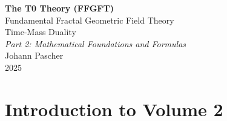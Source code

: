 
	
	\setcounter{section}{0}
	\setcounter{subsection}{0}
	\setcounter{subsubsection}{0}
	\setcounter{paragraph}{0}
	
	\setcounter{secnumdepth}{1}  %
	\makeatletter
	\renewcommand*\l@part[2]{%
		\ifnum \c@tocdepth >-2\relax
		\addpenalty{-\@highpenalty}%
		\addvspace{0.8em \@plus\p@}%
		{\leftskip 0em \relax
			\rightskip \@tocrmarg
			\parfillskip -\rightskip
			\parindent 0em \relax\@afterindenttrue
			\interlinepenalty\@M
			\leavevmode
			{\footnotesize\bfseries #1}\nobreak
			\leaders\hbox{$\m@th\mkern \@dotsep mu\hbox{}\mkern \@dotsep mu$}\hfill
			\nobreak\hb@xt@\@pnumwidth{\hss #2}\par}%
		\addvspace{0.2em \@plus\p@}%
		\nobreak
		\fi}
	\makeatother
	
	\renewcommand{\cftchapfont}{\footnotesize\bfseries}
	\renewcommand{\cftchappagefont}{\footnotesize\bfseries}
	\setlength{\cftbeforechapskip}{0.3em}
	
	\setcounter{tocdepth}{0}
	\begin{titlepage}
		\centering
		\vspace*{2cm}
		
		{\Huge\bfseries The T0 Theory (FFGFT)}\\[0.8cm]
		{\LARGE Fundamental Fractal Geometric Field Theory}\\[0.5cm]
		{\LARGE Time-Mass Duality}\\[1.5cm]
		
		{\Large\itshape Part 2: Mathematical Foundations and Formulas}\\[2cm]
		
		{\large Johann Pascher}\\[1cm]
		
		{\large 2025}
		
		\vfill
	\end{titlepage}
	
	\frontmatter
	\pagestyle{fancy}
	\makeatletter
	\let\ps@plain\ps@fancy
	\let\ps@empty\ps@fancy
	\makeatother
	
	\mainmatter
	\pagestyle{fancy}
	
	\tableofcontents
	
	\chapter{Introduction to Volume 2}
	
	

